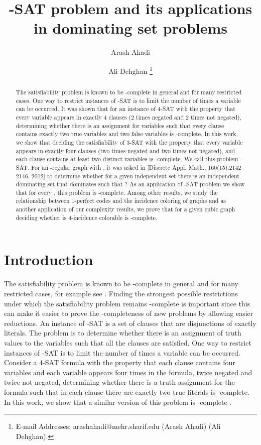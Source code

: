\documentclass[
final
]{dmtcs-episciences}
\author{Arash Ahadi\affiliationmark{1}
	\and Ali Dehghan \affiliationmark{2}
	\thanks{E-mail Addresses: 
		   arashahadi@mehr.sharif.edu (Arash Ahadi)  (Ali Dehghan).}}
\title[-SAT problem and its applications in dominating set problems]{-SAT problem and its applications in dominating set problems}
\affiliation{
Department of
	Mathematical Sciences, Sharif University of Technology, Tehran,
	Iran\\
	Systems and Computer Engineering Department, Carleton University, Ottawa,   Canada
}
\begin{document}
\maketitle
\begin{abstract}{
The satisfiability problem is known to be -complete in general and for many restricted
cases. One way to restrict instances of -SAT is to limit the number of times a variable can be occurred. It was shown that for an instance of 4-SAT with the property that every variable appears in exactly 4 clauses (2 times negated and 2 times not negated), determining whether there is an assignment for variables  such that every clause contains exactly two true variables and two false variables is -complete. In this work, we show that deciding the satisfiability of 3-SAT with the property that every variable appears in exactly four clauses (two times negated and two times not negated), and each clause contains at least two distinct variables is -complete. We call this problem -SAT. For an  -regular graph  with ,  it was asked in [Discrete Appl. Math., 160(15):2142--2146, 2012] to determine whether for a given independent set   there is an independent dominating set  that dominates  such that ?
As an application of -SAT problem  we show that  for every , this problem is  -complete.
Among other results, we study the relationship between 1-perfect codes and the incidence coloring of graphs and as  another application of our complexity results,
we  prove
that for a given cubic graph  deciding whether  is 4-incidence colorable  is -complete.
}\end{abstract}



\section{Introduction}

The satisfiability problem is known to be -complete in general and for many restricted
cases, for example see \cite{MR3544062,  MR3386014, MR3864719, MR2184613, MR3810276, MR2500722}. Finding the strongest possible restrictions under which the satisfiability problem remains -complete
is important since this can make it easier to prove the -completeness
of new problems by allowing easier reductions.
An instance of -SAT is a set of clauses that are disjunctions of exactly  literals. The problem is to determine
whether there is an assignment of truth values to the variables such that all the clauses are satisfied.
One way to restrict instances of -SAT is to limit the number of times a variable can be occurred.
Consider a 4-SAT formula with the property that each clause contains four variables and each variable appears four times in the formula, twice negated and twice not negated,
determining whether there is a truth assignment for the formula such that in each clause there are exactly two true literals is -complete. In this work, we show that a similar version of this problem is -complete \cite{Puzzle}.
\end{document}
